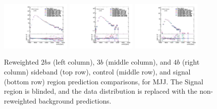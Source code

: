 \begin{figure}[htbp!]
\begin{center}
\includegraphics[width=0.3\textwidth,angle=-90]{figures/boosted/AppendixReweight/Compare/Data_TwoTag_split_Signal_directcompare_mHH_l_1.pdf}
\includegraphics[width=0.3\textwidth,angle=-90]{figures/boosted/AppendixReweight/Compare/Data_ThreeTag_Signal_directcompare_mHH_l_1.pdf}
\includegraphics[width=0.3\textwidth,angle=-90]{figures/boosted/AppendixReweight/Compare/Data_FourTag_Signal_directcompare_mHH_l_1.pdf}
\caption{Reweighted $2bs$ (left column), $3b$ (middle column), and $4b$ (right column) sideband (top row), control (middle row), and signal (bottom row) region prediction comparisons, for MJJ. The Signal region is blinded, and the data distribution is replaced with the non-reweighted background predictions.}
\label{fig:app-rw-comp}
\end{center}
\end{figure}

